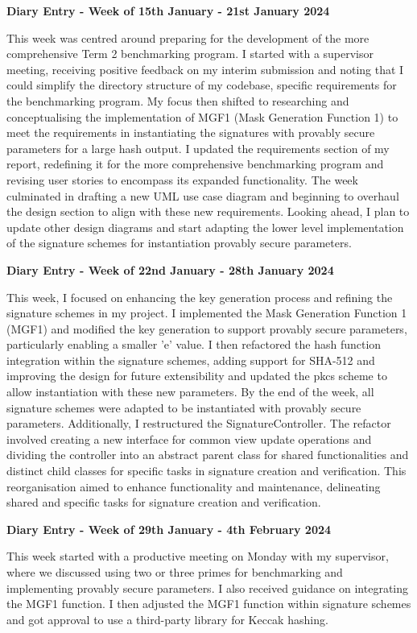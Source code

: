 \documentclass[]{final_report}
\theoremstyle{definition}
\begin{document}
\textbf{Diary Entry - Week of 15th January - 21st January 2024}

This week was centred around preparing for the development of the more comprehensive Term 2
benchmarking program. I started with a supervisor meeting, receiving positive feedback on my interim
submission and noting that I could simplify the directory structure of my codebase, specific
requirements for the benchmarking program. My focus then shifted to researching and conceptualising
the implementation of MGF1 (Mask Generation Function 1) to meet the requirements in instantiating
the signatures with provably secure parameters for a large hash output. I updated the requirements
section of my report, redefining it for the more comprehensive benchmarking program and revising
user stories to encompass its expanded functionality. The week culminated in drafting a new UML use
case diagram and beginning to overhaul the design section to align with these new requirements.
Looking ahead, I plan to update other design diagrams and start adapting the lower level
implementation of the signature schemes for instantiation provably secure parameters.

\textbf{Diary Entry - Week of 22nd January - 28th January 2024}

This week, I focused on enhancing the key generation process and refining the signature schemes in
my project. I implemented the Mask Generation Function 1 (MGF1) and modified the key generation to
support provably secure parameters, particularly enabling a smaller 'e' value. I then refactored the
hash function integration within the signature schemes, adding support for SHA-512 and improving the
design for future extensibility and updated the pkcs scheme to allow instantiation with
these new parameters. By the end of the week, all signature schemes were adapted to be instantiated
with provably secure parameters. Additionally, I restructured the SignatureController. The refactor
involved creating a new interface for common view update operations and dividing the controller into
an abstract parent class for shared functionalities and distinct child classes for specific tasks in
signature creation and verification. This reorganisation aimed to enhance functionality and
maintenance, delineating shared and specific tasks for signature creation and verification.

\textbf{Diary Entry - Week of 29th January - 4th February 2024}

This week started with a productive meeting on Monday with my supervisor, where we discussed using
two or three primes for benchmarking and implementing provably secure parameters. I also received
guidance on integrating the MGF1 function. I then adjusted the MGF1 function within signature
schemes and got approval to use a third-party library for Keccak hashing.
\end{document}
